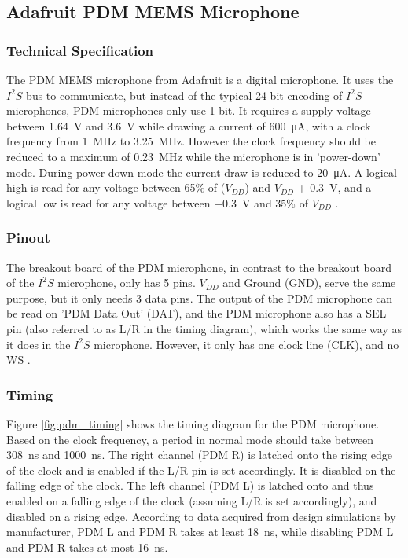 \subsection{Adafruit PDM MEMS Microphone}

\subsubsection{Technical Specification}

The PDM MEMS microphone from Adafruit \cite{pdm_mic} is a digital microphone.
It uses the $I^2S$ bus to communicate, but instead of the typical 24 bit encoding of $I^2S$ microphones, PDM microphones only use 1 bit.
It requires a supply voltage between \SI{1.64}{\volt} and \SI{3.6}{\volt} while drawing a current of \SI{600}{\micro\ampere}, with a clock
frequency from \SI{1}{\mega\hertz} to \SI{3.25}{\mega\hertz}.
However the clock frequency should be reduced to a maximum of \SI{0.23}{\mega\hertz} while the microphone is in 'power-down' mode.
During power down mode the current draw is reduced to \SI{20}{\micro\ampere}.
A logical high is read for any voltage between 65\% of ($V_{DD}$) and $V_{DD}$ + \SI{0.3}{\volt},
and a logical low is read for any voltage between \SI{-0.3}{\volt} and 35\% of $V_{DD}$ \cite{pdm_mic_datasheet}.

\subsubsection{Pinout}

The breakout board of the PDM microphone, in contrast to the breakout board of the $I^2S$ microphone, only has 5 pins.
$V_{DD}$ and Ground (GND), serve the same purpose, but it only needs 3 data pins.
The output of the PDM microphone can be read on 'PDM Data Out' (DAT), and the PDM microphone also has a SEL pin (also referred to as L/R in the timing diagram),
which works the same way as it does in the $I^2S$ microphone.
However, it only has one clock line (CLK), and no WS \cite{pdm_mic_pinout}.

\subsubsection{Timing}

Figure \ref{fig:pdm_timing} shows the timing diagram for the PDM microphone.
Based on the clock frequency, a period in normal mode should take between \SI{308}{\nano\second} and \SI{1000}{\nano\second}.
The right channel (PDM R) is latched onto the rising edge of the clock and is enabled if the L/R pin is set accordingly.
It is disabled on the falling edge of the clock.
The left channel (PDM L) is latched onto and thus enabled on a falling edge of the clock (assuming L/R is set accordingly),
and disabled on a rising edge.
According to data acquired from design simulations by manufacturer,
PDM L and PDM R takes at least \SI{18}{\nano\second}, while disabling PDM L and PDM R takes at most \SI{16}{\nano\second}.



